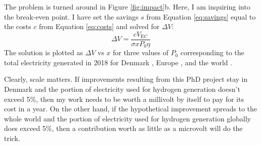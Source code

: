 \vspace{5mm}
The problem is turned around in Figure \ref{fig:impact}b. Here, I am inquiring into the break-even point. I have set the savings $s$ from Equation \ref{eq:savings} equal to the costs $c$ from Equation \ref{eq:costs} and solved for $\Delta V$:
\begin{equation}
\Delta V = \frac{c V_\text{EC}}{\sigma x P_0 \eta}
\end{equation}
The solution is plotted as $\Delta V$ vs $x$ for three values of $P_0$ corresponding to the total electricity generated in 2018 for Denmark \cite{EnergiNet}, Europe \cite{EEA2018}, and the world \cite{Enerdata2019}.

Clearly, scale matters. If improvements resulting from this PhD project stay in Denmark and the portion of electricity used for hydrogen generation doesn't exceed 5\%, then my work needs to be worth a millivolt by itself to pay for its  cost in a year. On the other hand, if the hypothetical improvement spreads to the whole world and the portion of electricity used for hydrogen generation globally does exceed 5\%, then a contribution worth as little as a microvolt will do the trick.

